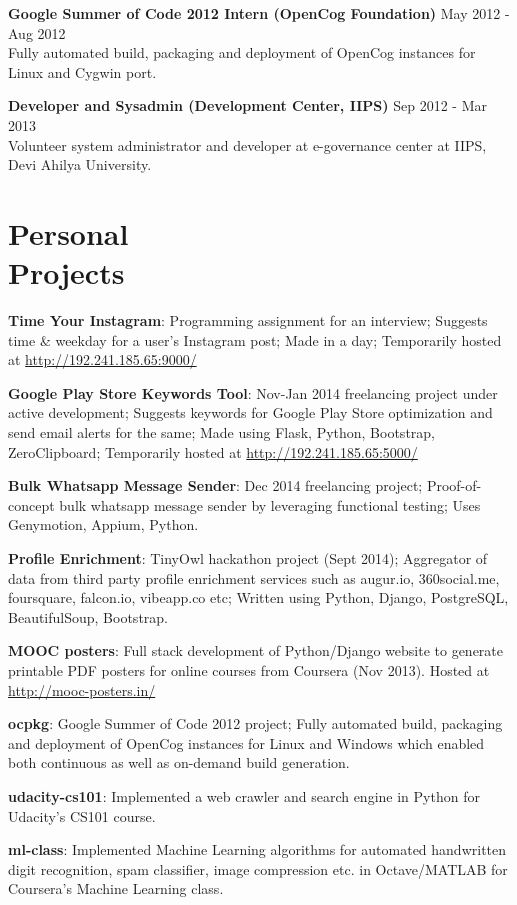 \documentclass[margin,line]{resume}
\begin{document}
\begin{resume}
\begin{list2}
	\item \textbf{Google Summer of Code 2012 Intern (OpenCog Foundation)} \hspace{18mm} May 2012 - Aug 2012 \\ Fully automated build, packaging and deployment of OpenCog instances for Linux and Cygwin port.

	\item \textbf{Developer and Sysadmin (Development Center, IIPS)} \hspace{30mm} Sep 2012 - Mar 2013 \\ Volunteer system administrator and developer at e-governance center at IIPS, Devi Ahilya University.

	\end{list2}

    \section{\mysidestyle Personal \\ Projects} 
	\begin{list2}

	\item \textbf{Time Your Instagram}: Programming assignment for an interview; Suggests time \& weekday for a user's Instagram post; Made in a day; Temporarily hosted at \url{http://192.241.185.65:9000/}
	\item \textbf{Google Play Store Keywords Tool}: Nov-Jan 2014 freelancing project under active development; Suggests keywords for Google Play Store optimization and send email alerts for the same; Made using Flask, Python, Bootstrap, ZeroClipboard; Temporarily hosted at \url{http://192.241.185.65:5000/}
	\item \textbf{Bulk Whatsapp Message Sender}: Dec 2014 freelancing project; Proof-of-concept bulk whatsapp message sender by leveraging functional testing; Uses Genymotion, Appium, Python.
	\item \textbf{Profile Enrichment}: TinyOwl hackathon project (Sept 2014); Aggregator of data from third party profile enrichment services such as augur.io, 360social.me, foursquare, falcon.io, vibeapp.co etc; Written using Python, Django, PostgreSQL, BeautifulSoup, Bootstrap.
	\item \textbf{MOOC posters}: Full stack development of Python/Django website to generate printable PDF posters for online courses from Coursera (Nov 2013). Hosted at \url{http://mooc-posters.in/}
	\item \textbf{ocpkg}: Google Summer of Code 2012 project; Fully automated build, packaging and deployment of OpenCog instances for Linux and Windows which enabled both continuous as well as on-demand build generation.
	\item \textbf{udacity-cs101}: Implemented a web crawler and search engine in Python for Udacity's CS101 course.
	\item \textbf{ml-class}: Implemented Machine Learning algorithms for automated handwritten digit recognition, spam classifier, image compression etc. in Octave/MATLAB for Coursera's Machine Learning class.
    \end{list2}


\end{resume}
\end{document}
